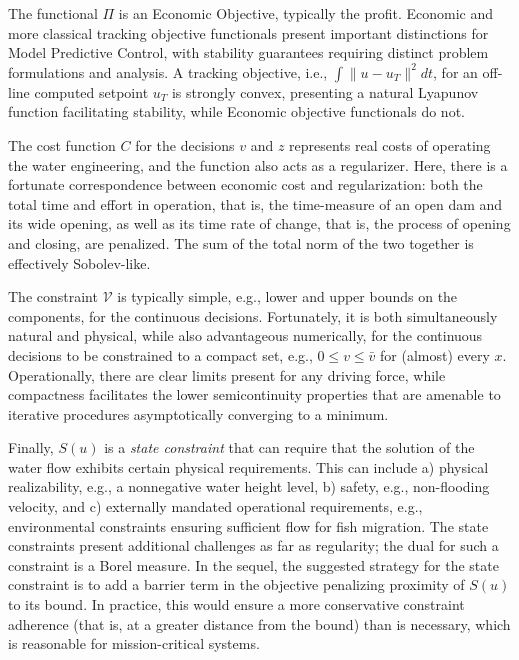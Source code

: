 \documentclass{article}
\newcommand{\1}{\mathds{1}}          %
\theoremstyle{definition}
\begin{document}
\begin{sloppypar}
The functional $\Pi$ is an Economic Objective, typically the profit. Economic and more classical tracking objective functionals present important distinctions for Model Predictive Control, with stability guarantees requiring distinct problem formulations and analysis. A tracking objective, i.e., $\int \|u-u_T\|^2  dt$, for an off-line computed setpoint $u_T$ is strongly convex, presenting a natural Lyapunov function facilitating stability, while Economic objective functionals do not. 

The cost function $C$ for the decisions $v$ and $z$ represents real costs of operating the water engineering, and the function also acts as a regularizer. Here, there is a fortunate correspondence between economic cost and regularization: both the total time and effort in operation, that is, the time-measure of an open dam and its wide opening, as well as its time rate of change, that is, the process of opening and closing, are penalized. The sum of the total norm of the two together is effectively Sobolev-like. 

The constraint $\mathcal{V}$ is typically simple, e.g., lower and upper bounds on the components, for the continuous decisions. Fortunately, it is both simultaneously natural and physical, while also advantageous numerically, for the continuous decisions to be constrained to a compact set, e.g., $0\le v\le \bar{v}$ for (almost) every $x$. Operationally, there are clear limits present for any driving force, while compactness facilitates the lower semicontinuity properties that are amenable to iterative procedures asymptotically converging to a minimum.

Finally, $S(u)$ is a \emph{state constraint} that can require that the solution of the water flow exhibits certain physical requirements. This can include a) physical realizability, e.g., a nonnegative water height level, b) safety, e.g., non-flooding velocity, and c) externally mandated operational requirements, e.g., environmental constraints ensuring sufficient flow for fish migration.
The state constraints present additional challenges as far as regularity; the dual for such a constraint is a Borel measure. In the sequel, the suggested strategy for the state constraint is to add a barrier term in the objective penalizing proximity of $S(u)$ to its bound. In practice, this would ensure a more conservative constraint adherence (that is, at a greater distance from the bound) than is necessary, which is reasonable for mission-critical systems.


\end{sloppypar}
\end{document}
